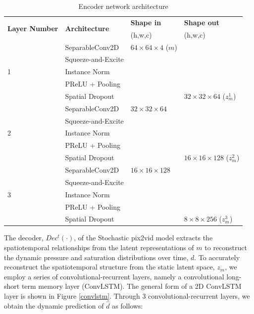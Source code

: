 \documentclass[10pt, twoside]{article}
\begin{document}
\begin{table}[t]
    \caption{Encoder network architecture}\label{tab1}
    \centering
    \begin{tabular}{@{} llll @{} }
    \toprule
        \multirow{2}{*}{\textbf{Layer Number}} & \multirow{2}{*}{\textbf{Architecture}} & \textbf{Shape in} & \textbf{Shape out} \\
         &    & (h,w,c)   & (h,w,c)            \\
    \midrule
        \multirow{5}{*}{1} & SeparableConv2D    &  $64\times64\times4$ ($m$) & \\
                           & Squeeze-and-Excite &  &  \\
                           & Instance Norm      &  &  \\
                           & PReLU + Pooling    &  &  \\
                           & Spatial Dropout    &  & $32\times32\times64$ ($z_m^1$) \\
        \hline                      
        \multirow{5}{*}{2} & SeparableConv2D    & $32\times32\times64$ & \\
                           & Squeeze-and-Excite & & \\
                           & Instance Norm      & & \\
                           & PReLU + Pooling    & & \\
                           & Spatial Dropout    & & $16\times16\times128$ ($z_m^2$) \\
        \hline
        \multirow{5}{*}{3} & SeparableConv2D    & $16\times16\times128$ & \\
                           & Squeeze-and-Excite & & \\
                           & Instance Norm      & & \\
                           & PReLU + Pooling    & & \\
                           & Spatial Dropout    & & $8\times8\times256$  ($z_m^3$) \\
    \bottomrule
    \end{tabular}
\end{table}

The decoder, $Dec^t(\cdot)$, of the Stochastic pix2vid model extracts the spatiotemporal relationships from the latent representations of $m$ to reconstruct the dynamic pressure and saturation distributions over time, $d$. To accurately reconstruct the spatiotemporal structure from the static latent space, $z_m$, we employ a series of convolutional-recurrent layers, namely a convolutional long-short term memory layer (ConvLSTM). The general form of a 2D ConvLSTM layer is shown in Figure \ref{convlstm}. Through 3 convolutional-recurrent layers, we obtain the dynamic prediction of $\hat{d}$ as follows:
\end{document}
